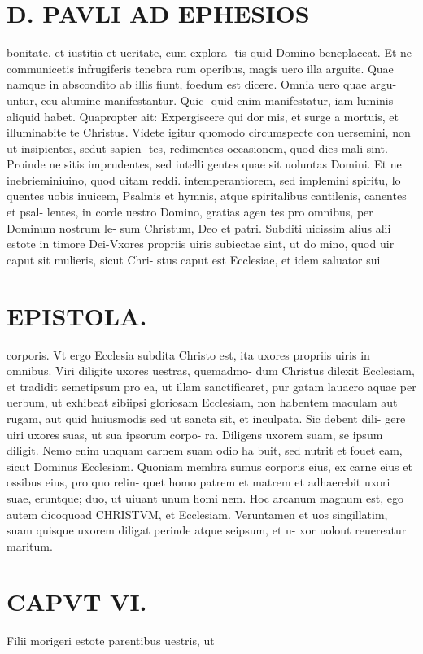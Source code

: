 \documentclass{article}
\begin{document}
\begin{pages}
\section*{D. PAVLI AD EPHESIOS }
\marginpar{[ p.6.  ]}
\marginpar{[ p.7.  ]}
\marginpar{[ p.8.  ]}
\marginpar{[ p.9.  ]}\pstart bonitate, et iustitia et ueritate, cum explora- tis quid Domino beneplaceat.  \pend\pstart Et ne communicetis infrugiferis tenebra rum operibus, magis uero illa arguite. Quae namque in abscondito ab illis fiunt, foedum est dicere. Omnia uero quae argu- untur, ceu alumine manifestantur. Quic- quid enim manifestatur, iam luminis aliquid habet. Quapropter ait: Expergiscere qui dor mis, et surge a mortuis, et illuminabite te Christus.  \pend\pstart Videte igitur quomodo circumspecte con uersemini, non ut insipientes, sedut sapien- tes, redimentes occasionem, quod dies mali sint. Proinde ne sitis imprudentes, sed intelli gentes quae sit uoluntas Domini.  \pend\pstart Et ne inebrieminiuino, quod uitam reddi. intemperantiorem, sed implemini spiritu, lo quentes uobis inuicem, Psalmis et hymnis, atque spiritalibus cantilenis, canentes et psal- lentes, in corde uestro Domino, gratias agen tes pro omnibus, per Dominum nostrum le- sum Christum, Deo et patri.  \pend\pstart Subditi uicissim alius alii estote in timore Dei-Vxores propriis uiris subiectae sint, ut do mino, quod uir caput sit mulieris, sicut Chri- stus caput est Ecclesiae, et idem saluator sui  \pend
\section*{EPISTOLA. }
\marginpar{[ p.2 ]}
\marginpar{[ p.10.  ]}
\marginpar{[ p.11.  ]}\pstart corporis. Vt ergo Ecclesia subdita Christo est, ita uxores propriis uiris in omnibus.  \pend\pstart Viri diligite uxores uestras, quemadmo- dum Christus dilexit Ecclesiam, et tradidit semetipsum pro ea, ut illam sanctificaret, pur gatam lauacro aquae per uerbum, ut exhibeat sibiipsi gloriosam Ecclesiam, non habentem maculam aut rugam, aut quid huiusmodis sed ut sancta sit, et inculpata. Sic debent dili- gere uiri uxores suas, ut sua ipsorum corpo- ra. Diligens uxorem suam, se ipsum diligit. Nemo enim unquam carnem suam odio ha buit, sed nutrit et fouet eam, sicut Dominus Ecclesiam.  \pend\pstart Quoniam membra sumus corporis eius, ex carne eius et ossibus eius, pro quo relin- quet homo patrem et matrem et adhaerebit uxori suae, eruntque; duo, ut uiuant unum homi nem. Hoc arcanum magnum est, ego autem dicoquoad CHRISTVM, et Ecclesiam. Veruntamen et uos singillatim, suam quisque uxorem diligat perinde atque seipsum, et u- xor uolout reuereatur maritum.  \pend
\endnumbering\beginnumbering\section{CAPVT VI.}\pstart Filii morigeri estote parentibus uestris, ut  \pend

\end{pages}
\end{document}
